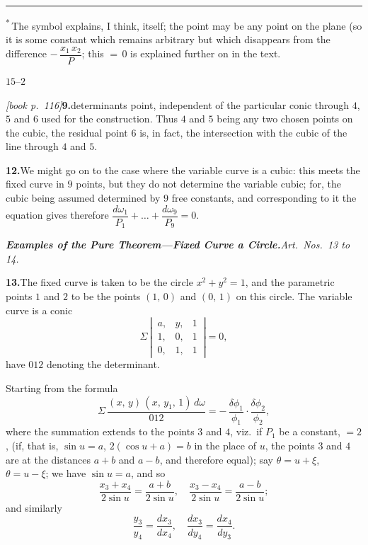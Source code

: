 \documentclass[11pt,a4paper]{article}
\theoremstyle{plain}
\theoremstyle{definition}
\theoremstyle{remark}
\begin{document}
\bigskip

\hrule
\smallskip
\noindent\textsuperscript{*}\,The symbol explains, I think, itself; the point may be any point on the plane (so it is some constant which remains arbitrary but which disappears from the difference $-\,\dfrac{x_1\,x_2}{P}$; this $=\,0$ is explained further on in the text.

\hfill $15$--$2$

\noindent\textit{[book p.~116]}\quad \textbf{9.}\quad determinants point, independent of the particular conic through $4$, $5$ and $6$ used for the construction. Thus $4$ and $5$ being any two chosen points on the cubic, the residual point $6$ is, in fact, the intersection with the cubic of the line through $4$ and $5$.

\medskip\noindent\textbf{12.}\quad We might go on to the case where the variable curve is a cubic: this meets the fixed curve in $9$ points, but they do not determine the variable cubic; for, the cubic being assumed determined by $9$ free constants, and corresponding to it the equation gives therefore $\dfrac{d\omega_1}{P_1} + \ldots + \dfrac{d\omega_9}{P_9} = 0$.

\medskip\noindent\textit{\textbf{Examples of the Pure Theorem---Fixed Curve a Circle.}\quad Art.\ Nos.\ 13 to 14.}

\medskip\noindent\textbf{13.}\quad The fixed curve is taken to be the circle $x^2 + y^2 = 1$, and the parametric points $1$ and $2$ to be the points $(1,\,0)$ and $(0,\,1)$ on this circle. The variable curve is a conic
\[
\Sigma\,\left|\,\begin{array}{ccc}
a, & y, & 1 \\
1, & 0, & 1 \\
0, & 1, & 1
\end{array}\,\right| = 0,
\]
have $012$ denoting the determinant.

Starting from the formula
\[
\Sigma\,\frac{(x,\,y)\,(x,\,y_1,\,1)\,d\omega}{012} = -\,\frac{\delta\phi_1}{\phi_1}\cdot\frac{\delta\phi_2}{\phi_2},
\]
where the summation extends to the points $3$ and $4$, viz.\ if $P_1$ be a constant, $= 2$, (if, that is, $\sin u = a$, $2 (\cos u + a) = b$ in the place of $u$, the points $3$ and $4$ are at the distances $a + b$ and $a - b$, and therefore equal); say $\theta = u + \xi$, $\theta = u - \xi$; we have $\sin u = a$, and so
\[
\frac{x_3 + x_4}{2\sin u} = \frac{a + b}{2\sin u},\quad \frac{x_3 - x_4}{2\sin u} = \frac{a - b}{2\sin u};
\]
and similarly
\[
\frac{y_3}{y_4} = \frac{dx_3}{dx_4},\quad \frac{dx_3}{dy_4} = \frac{dx_4}{dy_3}.
\]
\end{document}
